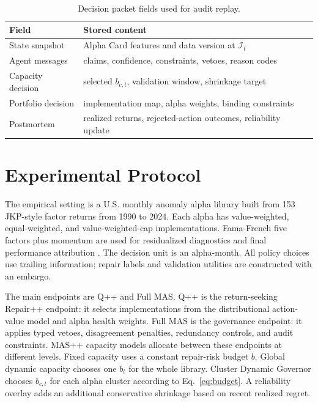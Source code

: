 \documentclass[sigconf,nonacm]{acmart}
\newcommand{\calI}{\mathcal{I}}
\begin{document}
\begin{table}[t]
\centering
\caption{Decision packet fields used for audit replay.}
\label{tab:packet}
\scriptsize
\setlength{\tabcolsep}{2.4pt}
\begin{tabular}{p{}p{}}
\toprule
Field & Stored content \\
\midrule
State snapshot & Alpha Card features and data version at \(\calI_t\) \\
Agent messages & claims, confidence, constraints, vetoes, reason codes \\
Capacity decision & selected \(b_{c,t}\), validation window, shrinkage target \\
Portfolio decision & implementation map, alpha weights, binding constraints \\
Postmortem & realized returns, rejected-action outcomes, reliability update \\
\bottomrule
\end{tabular}
\end{table}

\section{Experimental Protocol}

The empirical setting is a U.S. monthly anomaly alpha library built from 153 JKP-style factor returns from 1990 to 2024. Each alpha has value-weighted, equal-weighted, and value-weighted-cap implementations. Fama-French five factors plus momentum are used for residualized diagnostics and final performance attribution \cite{fama1993common,carhart1997persistence,fama2015five}. The decision unit is an alpha-month. All policy choices use trailing information; repair labels and validation utilities are constructed with an embargo.

The main endpoints are Q++ and Full MAS. Q++ is the return-seeking Repair++ endpoint: it selects implementations from the distributional action-value model and alpha health weights. Full MAS is the governance endpoint: it applies typed vetoes, disagreement penalties, redundancy controls, and audit constraints. MAS++ capacity models allocate between these endpoints at different levels. Fixed capacity uses a constant repair-risk budget \(b\). Global dynamic capacity chooses one \(b_t\) for the whole library. Cluster Dynamic Governor chooses \(b_{c,t}\) for each alpha cluster according to Eq.~\eqref{eq:budget}. A reliability overlay adds an additional conservative shrinkage based on recent realized regret.
\end{document}
